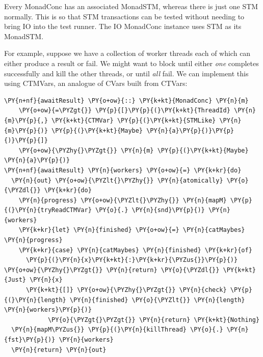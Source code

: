 \begin{departure}
  Every MonadConc has an associated MonadSTM, whereas there is just
  one STM normally. This is so that STM transactions can be tested
  without needing to bring IO into the test runner. The IO MonadConc
  instance uses STM as its MonadSTM.
\end{departure}

For example, suppose we have a collection of worker threads each of
which can either produce a result or fail. We might want to block
until either \textit{one} completes successfully and kill the other
threads, or until \textit{all} fail. We can implement this using
CTMVars, an analogue of CVars built from CTVars:


\begin{Verbatim}[commandchars=\\\{\}]
\PY{n+nf}{awaitResult} \PY{o+ow}{::} \PY{k+kt}{MonadConc} \PY{n}{m}
    \PY{o+ow}{=\PYZgt{}} \PY{p}{[}\PY{p}{(}\PY{k+kt}{ThreadId} \PY{n}{m}\PY{p}{,} \PY{k+kt}{CTMVar} \PY{p}{(}\PY{k+kt}{STMLike} \PY{n}{m}\PY{p}{)} \PY{p}{(}\PY{k+kt}{Maybe} \PY{n}{a}\PY{p}{)}\PY{p}{)}\PY{p}{]}
    \PY{o+ow}{\PYZhy{}\PYZgt{}} \PY{n}{m} \PY{p}{(}\PY{k+kt}{Maybe} \PY{n}{a}\PY{p}{)}
\PY{n+nf}{awaitResult} \PY{n}{workers} \PY{o+ow}{=} \PY{k+kr}{do}
  \PY{n}{out} \PY{o+ow}{\PYZlt{}\PYZhy{}} \PY{n}{atomically} \PY{o}{\PYZdl{}} \PY{k+kr}{do}
    \PY{n}{progress} \PY{o+ow}{\PYZlt{}\PYZhy{}} \PY{n}{mapM} \PY{p}{(}\PY{n}{tryReadCTMVar} \PY{o}{.} \PY{n}{snd}\PY{p}{)} \PY{n}{workers}
    \PY{k+kr}{let} \PY{n}{finished} \PY{o+ow}{=} \PY{n}{catMaybes} \PY{n}{progress}
    \PY{k+kr}{case} \PY{n}{catMaybes} \PY{n}{finished} \PY{k+kr}{of}
      \PY{p}{(}\PY{n}{x}\PY{k+kt}{:}\PY{k+kr}{\PYZus{}}\PY{p}{)} \PY{o+ow}{\PYZhy{}\PYZgt{}} \PY{n}{return} \PY{o}{\PYZdl{}} \PY{k+kt}{Just} \PY{n}{x}
      \PY{k+kt}{[]} \PY{o+ow}{\PYZhy{}\PYZgt{}} \PY{n}{check} \PY{p}{(}\PY{n}{length} \PY{n}{finished} \PY{o}{\PYZlt{}} \PY{n}{length} \PY{n}{workers}\PY{p}{)}
            \PY{o}{\PYZgt{}\PYZgt{}} \PY{n}{return} \PY{k+kt}{Nothing}
  \PY{n}{mapM\PYZus{}} \PY{p}{(}\PY{n}{killThread} \PY{o}{.} \PY{n}{fst}\PY{p}{)} \PY{n}{workers}
  \PY{n}{return} \PY{n}{out}
\end{Verbatim}

